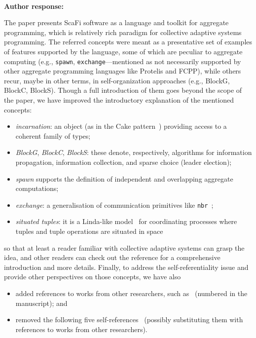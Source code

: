 \documentclass{article}
\newcommand{\reply}[1]{	\\[2pt]
	\textbf{Author response:} 	
	#1
}
\begin{document}
\reply{ 
The paper presents ScaFi software as a language and toolkit for aggregate programming, which is relatively rich paradigm for collective adaptive systems programming. 
The referred concepts were meant as a presentative set of examples of features supported by the language, some of which are peculiar to aggregate computing (e.g., \texttt{spawn}, \texttt{exchange}---mentioned as not necessarily supported by other aggregate programming languages like Protelis and FCPP), while others recur, maybe in other terms, in self-organization approaches (e.g., BlockG, BlockC, BlockS). Though a full introduction of them goes beyond the scope of the paper, we have improved the introductory explanation of the mentioned concepts:
\begin{itemize}
\item \emph{incarnation}: an object (as in the Cake pattern~\cite{DBLP:conf/oopsla/OderskyZ05,Hunt2013cakepattern}) providing access to a coherent family of types;
\item \emph{BlockG}, \emph{BlockC}, \emph{BlockS}: these denote, respectively, algorithms for information propagation, information collection, and sparse choice (leader election);
\item \emph{spawn} supports the definition of independent and overlapping aggregate computations;
\item \emph{exchange}: a generalisation of communication primitives like \texttt{nbr}~\cite{DBLP:journals/tocl/AudritoVDPB19};
\item \emph{situated tuples}: it is a Linda-like model~\cite{DBLP:journals/toplas/Gelernter85} for coordinating processes where tuples and tuple operations are situated in space
\end{itemize}
%
so that at least a reader familiar with collective adaptive systems can grasp the idea, and other readers can check out the reference for a comprehensive introduction and more details.
%
Finally, to address the self-referentiality issue and provide other perspectives on those concepts, we have also 
\begin{itemize}
\item added references to works from other researchers, such as~\cite{DBLP:conf/saso/WolfH07,DBLP:conf/sac/BealBVT08,testa2022processes} (numbered \cite{main:DBLP:conf/saso/WolfH07,DBLP:conf/sac/BealBVT08,testa2022processes} in the manuscript); and 
\item removed the following five self-references~\cite{DBLP:conf/saso/AudritoCDV17,DBLP:journals/fgcs/CasadeiFPRSV19,DBLP:journals/jfp/SaitoIV08,DBLP:journals/tasm/BucchiaroneDPCS20,DBLP:conf/huc/ViroliCP16} (possibly substituting them with references to works from other researchers). 

\end{itemize}}
\end{document}
